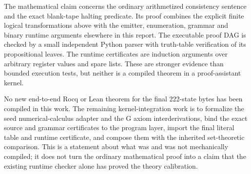 The mathematical claim concerns the ordinary arithmetized consistency
sentence and the exact blank-tape halting predicate.  Its proof combines
the explicit finite logical transformations above with the emitter,
enumeration, grammar and binary runtime arguments elsewhere in this
report.  The executable proof DAG is checked by a small independent
Python parser with truth-table verification of its propositional leaves.
The runtime certificates are induction arguments over arbitrary
register values and spare lists.  These are stronger evidence than
bounded execution tests, but neither is a compiled theorem in a
proof-assistant kernel.

No new end-to-end Rocq or Lean theorem for the final 222-state bytes has
been compiled in this work.  The remaining kernel-integration work is
to formalize the seed numerical-calculus adapter and the G axiom
interderivations, bind the exact source and grammar certificates to the
program layer, import the final literal table and runtime certificate,
and compose them with the inherited set-theoretic comparison.  This is
a statement about what was and was not mechanically compiled; it does
not turn the ordinary mathematical proof into a claim that the existing
runtime checker alone has proved the theory calibration.
